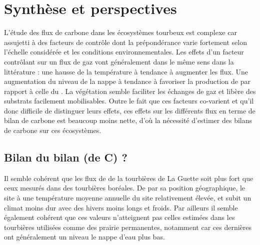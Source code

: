 \chapter*{Synthèse et perspectives}
\newpage

L'étude des flux de carbone dans les écosystèmes tourbeux est complexe car assujetti à des facteurs de contrôle dont la prépondérance varie fortement selon l'échelle considérée et les conditions environnementales.
Les effets d'un facteur contrôlant sur un flux de gaz vont généralement dans le même sens dans la littérature : 
une hausse de la température à tendance à augmenter les flux.
Une augmentation du niveau de la nappe à tendance à favoriser la production de \chh par rapport à celle du \coo.
La végétation semble faciliter les échanges de gaz et libère des substrats facilement mobilisables.
Outre le fait que ces facteurs co-varient et qu'il donc difficile de distinguer leurs effets, ces effets sur les différents flux en terme de bilan de carbone est beaucoup moins nette, d'où la nécessité d'estimer des bilans de carbone sur ces écosystèmes.

\section*{Bilan du bilan (de C) ?}

Il semble cohérent que les flux de \coo de la tourbières de La Guette soit plus fort que ceux mesurés dans des tourbières boréales.
De par sa position géographique, le site à une température moyenne annuelle du site relativement élevée, et subit un climat moins dur avec des hivers moins longs et froids.
Par ailleurs il semble également cohérent que ces valeurs n'atteignent pas celles estimées dans les tourbières utilisées comme des prairie permanentes, notamment car ces dernières ont généralement un niveau le nappe d'eau plus bas.




